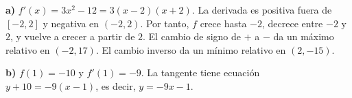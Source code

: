 \textbf{a)} $f'(x)=3x^2-12=3(x-2)(x+2)$.
La derivada es positiva fuera de $[-2,2]$ y negativa en $(-2,2)$.
Por tanto, $f$ crece hasta $-2$, decrece entre $-2$ y $2$,
y vuelve a crecer a partir de $2$. El cambio de signo de
$+$ a $-$ da un máximo relativo en $\boxed{(-2,17)}$.
El cambio inverso da un mínimo relativo en $\boxed{(2,-15)}$.

\textbf{b)} $f(1)=-10$ y $f'(1)=-9$. La tangente tiene
ecuación $y+10=-9(x-1)$, es decir, $\boxed{y=-9x-1}$.
